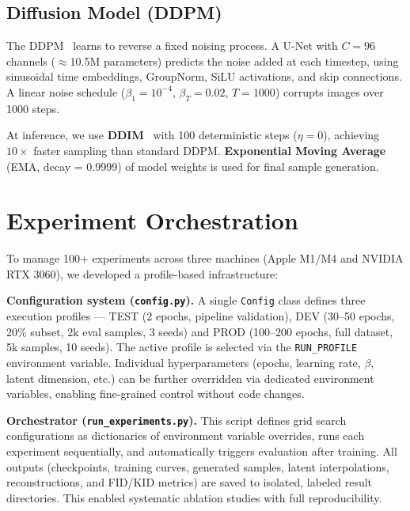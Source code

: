 \documentclass[runningheads]{llncs}
\begin{document}
\subsection{Diffusion Model (DDPM)}

The DDPM~\cite{ho2020} learns to reverse a fixed noising process. A U-Net with $C=96$ channels ($\approx$10.5M parameters) predicts the noise added at each timestep, using sinusoidal time embeddings, GroupNorm, SiLU activations, and skip connections. A linear noise schedule ($\beta_1=10^{-4}$, $\beta_T=0.02$, $T=1000$) corrupts images over 1000 steps.

At inference, we use \textbf{DDIM}~\cite{song2020} with 100 deterministic steps ($\eta = 0$), achieving $10\times$ faster sampling than standard DDPM. \textbf{Exponential Moving Average} (EMA, decay = 0.9999) of model weights is used for final sample generation.

\section{Experiment Orchestration}\label{sec:engineering}

To manage 100+ experiments across three machines (Apple M1/M4 and NVIDIA RTX 3060), we developed a profile-based infrastructure:

\textbf{Configuration system (\texttt{config.py}).} A single \texttt{Config} class defines three execution profiles --- TEST (2 epochs, pipeline validation), DEV (30--50 epochs, 20\% subset, 2k eval samples, 3 seeds) and PROD (100--200 epochs, full dataset, 5k samples, 10 seeds). The active profile is selected via the \texttt{RUN\_PROFILE} environment variable. Individual hyperparameters (epochs, learning rate, $\beta$, latent dimension, etc.) can be further overridden via dedicated environment variables, enabling fine-grained control without code changes.

\textbf{Orchestrator (\texttt{run\_experiments.py}).} This script defines grid search configurations as dictionaries of environment variable overrides, runs each experiment sequentially, and automatically triggers evaluation after training. All outputs (checkpoints, training curves, generated samples, latent interpolations, reconstructions, and FID/KID metrics) are saved to isolated, labeled result directories. This enabled systematic ablation studies with full reproducibility.

\end{document}
